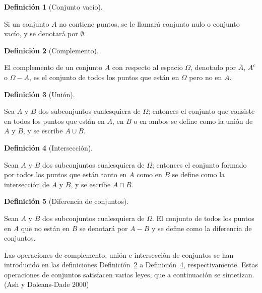 \documentclass[
  us-letterpaper,
]{scrreprt}
\theoremstyle{definition}
\theoremstyle{plain}
\theoremstyle{plain}
\theoremstyle{definition}
\newtheorem{definition}{Definición}[chapter]
\theoremstyle{remark}
\begin{document}
\begin{definition}[Conjunto
vacío]\protect\hypertarget{def-emptyset}{}\label{def-emptyset}

Si un conjunto \(A\) no contiene puntos, se le llamará conjunto nulo o
conjunto vacío, y se denotará por \(\emptyset\).

\end{definition}

\begin{definition}[Complemento]\protect\hypertarget{def-comp}{}\label{def-comp}

El complemento de un conjunto \(A\) con respecto al espacio \(\Omega\),
denotado por \(\overline{A}\), \(A^c\) o \(\Omega-A\), es el conjunto de
todos los puntos que están en \(\Omega\) pero no en \(A\).

\end{definition}

\begin{definition}[Unión]\protect\hypertarget{def-union}{}\label{def-union}

Sea \(A\) y \(B\) dos subconjuntos cualesquiera de \(\Omega\); entonces
el conjunto que consiste en todos los puntos que están en \(A\), en
\(B\) o en ambos se define como la unión de \(A\) y \(B\), y se escribe
\(A \cup B\).

\end{definition}

\begin{definition}[Intersección]\protect\hypertarget{def-inter}{}\label{def-inter}

Sean \(A\) y \(B\) dos subconjuntos cualesquiera de \(\Omega\); entonces
el conjunto formado por todos los puntos que están tanto en \(A\) como
en \(B\) se define como la intersección de \(A\) y \(B\), y se escribe
\(A \cap B\).

\end{definition}

\begin{definition}[Diferencia de
conjuntos]\protect\hypertarget{def-dfc}{}\label{def-dfc}

Sean \(A\) y \(B\) dos subconjuntos cualesquiera de \(\Omega\). El
conjunto de todos los puntos en \(A\) que no están en \(B\) se denotará
por \(A-B\) y se define como la diferencia de conjuntos.

\end{definition}

Las operaciones de complemento, unión e intersección de conjuntos se han
introducido en las definiciones Definición~\ref{def-comp} a
Definición~\ref{def-inter}, respectivamente. Estas operaciones de
conjuntos satisfacen varias leyes, que a continuación se sintetizan.
(Ash y Doleans-Dade 2000)
\end{document}

